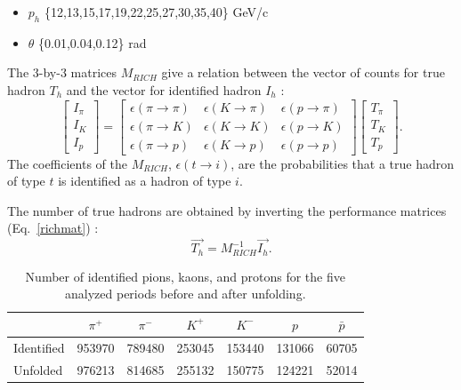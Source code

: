 \begin{itemize}
  \item $p_h$ \{12,13,15,17,19,22,25,27,30,35,40\} GeV/c
  \item $\theta$ \{0.01,0.04,0.12\} rad
\end{itemize}

The $3$-by-$3$ matrices $M_{RICH}$ give a relation between the vector of counts for true hadron $T_h$ and the vector for identified hadron $I_h$ :
%
\begin{equation}
\begin{bmatrix}
I_{\pi} \\
I_K \\
I_p
\end{bmatrix}
=
\begin{bmatrix}
\epsilon(\pi \rightarrow \pi) & \epsilon(K \rightarrow \pi) & \epsilon(p \rightarrow \pi)\\
\epsilon(\pi \rightarrow K) & \epsilon(K \rightarrow K) & \epsilon(p \rightarrow K) \\
\epsilon(\pi \rightarrow p) & \epsilon(K \rightarrow p) & \epsilon(p \rightarrow p)
\end{bmatrix}
\begin{bmatrix}
T_{\pi} \\
T_K \\
T_p
\end{bmatrix}.
\end{equation}
%
The coefficients of the $M_{RICH}$, $\epsilon(t \rightarrow i)$, are the probabilities that a true hadron of type
$t$ is identified as a hadron of type $i$.

The number of true hadrons are obtained by inverting the performance matrices (Eq.~\ref{richmat}) :
%
\begin{equation}
  \overrightarrow{T_h} = M^{-1}_{RICH}\overrightarrow{I_h}.
	\label{richmat}
\end{equation}
%
\begin{table}[!h]
  \caption{\label{HadNum} Number of identified pions, kaons, and protons for the five analyzed periods before and after unfolding.}
  \centering
  \begin{tabular}{lcccccc}
    \hline
     & $\pi^+$ & $\pi^-$ & $K^+$ & $K^-$ & $p$ & $\bar{p}$ \\
    \hline
    Identified & 953970 & 789480 & 253045 & 153440 & 131066 & 60705 \\
    Unfolded & 976213 & 814685 & 255132 & 150775 & 124221 & 52014 \\
    \hline
  \end{tabular}
\end{table}

